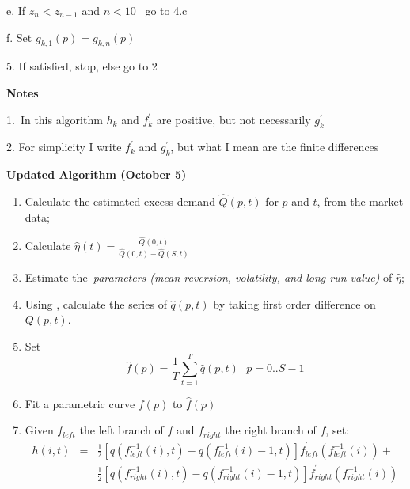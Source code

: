 \documentclass{article}
\begin{document}
\qquad e. If $z_{n}<z_{n-1}$ and $n<10$ \ go to 4.c

\qquad f. Set $g_{k,1}(p)=g_{k,n}(p)$

5. If satisfied, stop, else go to 2

\bigskip

\textbf{Notes}

1.\ In this algorithm $h_{k}$ and $f_{k}^{\prime }$ are positive, but not
necessarily $g_{k}^{\prime }$

2. For simplicity I write $f_{k}^{\prime }$ and $g_{k}^{\prime }$, but what
I mean are the finite differences

\bigskip

\textbf{Updated Algorithm (October 5)}

\begin{enumerate}
\item Calculate the estimated excess demand $\hat{Q}(p,t)$ for $p$ and $t$,
from the market data;

\item Calculate $\hat{\eta}(t)=\frac{\hat{Q}(0,t)}{\hat{Q}(0,t)-\hat{Q}(S,t)}
$

\item Estimate the\textit{\ parameters (mean-reversion, volatility, and long
run value) }of $\hat{\eta}$;

\item Using \cite{equ_Q_A}, calculate the series of $\hat{q}(p,t)$ by taking
first order difference on $Q(p,t)$.

\item Set%
\begin{equation*}
\hat{f}(p)=\frac{1}{T}\sum_{t=1}^{T}\hat{q}(p,t)\text{ \ \ \ \ }p=0..S-1
\end{equation*}

\item Fit a parametric curve $f(p)$ to $\hat{f}(p)$

\item Given $f_{left}$ the left branch of $f$ and $f_{right}$ the right
branch of $f$, set:%
\begin{eqnarray*}
h(i,t) &=&\frac{1}{2}\left[ q(f_{left}^{-1}(i),t)-q(f_{left}^{-1}(i)-1,t)%
\right] f_{left}^{^{\prime }}(f_{left}^{-1}(i))+ \\
&&\frac{1}{2}\left[ q(f_{right}^{-1}(i),t)-q(f_{right}^{-1}(i)-1,t)\right]
f_{right}^{^{\prime }}(f_{right}^{-1}(i))
\end{eqnarray*}


\end{enumerate}
\end{document}
